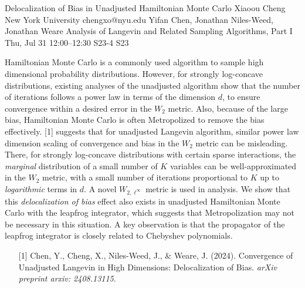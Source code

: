 \begin{talk}
  {Delocalization of Bias in Unadjusted Hamiltonian Monte Carlo}%
  {Xiaoou Cheng}%
  {New York University}%
  {chengxo@nyu.edu}%
  {Yifan Chen, Jonathan Niles-Weed, Jonathan Weare}%
  {Analysis of Langevin and Related Sampling Algorithms, Part I}%
  {Thu, Jul 31 12:00–12:30}%
  {S23-4}%
  {S23}%
				
			
Hamiltonian Monte Carlo is a commonly used algorithm to sample high dimensional probability distributions. However, for strongly log-concave distributions, existing analyses of the unadjusted algorithm show that the number of iterations follows a power law in terms of the dimension $d$, to ensure convergence within a desired error in the $W_2$ metric. Also, because of the large bias, Hamiltonian Monte Carlo is often Metropolized to remove the bias effectively. [1] suggests that for unadjusted Langevin algorithm, similar power law dimension scaling of convergence and bias in the $W_2$ metric can be misleading. There, for strongly log-concave distributions with certain sparse interactions, the \emph{marginal} distribution of a small number of $K$ variables can be well-approximated in the $W_2$ metric, with a small number of iterations proportional to $K$ up to \emph{logarithmic} terms in $d$. A novel $W_{2,\ell^\infty}$ metric is used in analysis. We show that this \emph{delocalization of bias} effect also exists in unadjusted Hamiltonian Monte Carlo with the leapfrog integrator, which suggests that Metropolization may not be necessary in this situation. A key observation is that the propagator of the leapfrog integrator is closely related to Chebyshev polynomials.

\medskip

\begin{enumerate}
	\item[{[1]}] Chen, Y., Cheng, X., Niles-Weed, J., \& Weare, J. (2024). Convergence of Unadjusted Langevin in High Dimensions: Delocalization of Bias. \textit{arXiv preprint arxiv: 2408.13115}.
\end{enumerate}

\end{talk}

